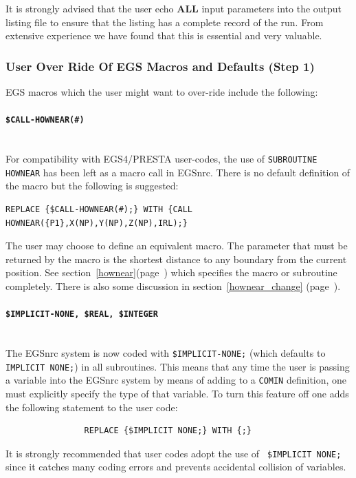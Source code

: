 It is strongly advised that the user echo {\bfseries ALL} input parameters
into the output listing file to ensure that the listing has a complete
record of the run.  From extensive experience we have found that this is
essential and very valuable.


 \subsubsection{User Over Ride Of EGS Macros and Defaults (Step 1)}
\label{step_1}

EGS macros which the user might want to over-ride include the following:

\paragraph{{\tt \$CALL-HOWNEAR(\#)}}
\label{hownear_macro}
\mbox{}\\
For compatibility with  EGS4/PRESTA user-codes, the use of {\tt SUBROUTINE
HOWNEAR} has been left as a macro call in EGSnrc.
There is no default definition of the macro but the following is suggested:
\begin{verbatim}
REPLACE {$CALL-HOWNEAR(#);} WITH {CALL HOWNEAR({P1},X(NP),Y(NP),Z(NP),IRL);}
\end{verbatim}
The user may choose to define an equivalent macro.
The parameter that must be returned by the macro
is the shortest distance to any
boundary from the current position. See
section~\ref{hownear}(page~\pageref{hownear}) which
specifies the macro or subroutine completely.  There is also some
discussion in section~\ref{hownear_change} (page~\pageref{hownear_change}).

\paragraph{{\tt \$IMPLICIT-NONE, \$REAL, \$INTEGER}}
\label{implicit_none}
\mbox{}\\
The EGSnrc system is now coded with {\tt \$IMPLICIT-NONE;} (which defaults
to {\tt IMPLICIT NONE;}) in all
subroutines. This means that any time the user is passing a variable
into the EGSnrc system by means of adding to a {\tt COMIN} definition, one
must explicitly specify the type of that variable.  To turn this feature off one adds
the following statement to the user code:
\begin{verbatim}
                REPLACE {$IMPLICIT NONE;} WITH {;}
\end{verbatim}
It is strongly recommended that user codes adopt the use of {\tt
\$IMPLICIT NONE;} since it catches many coding errors and prevents
accidental collision of variables.

